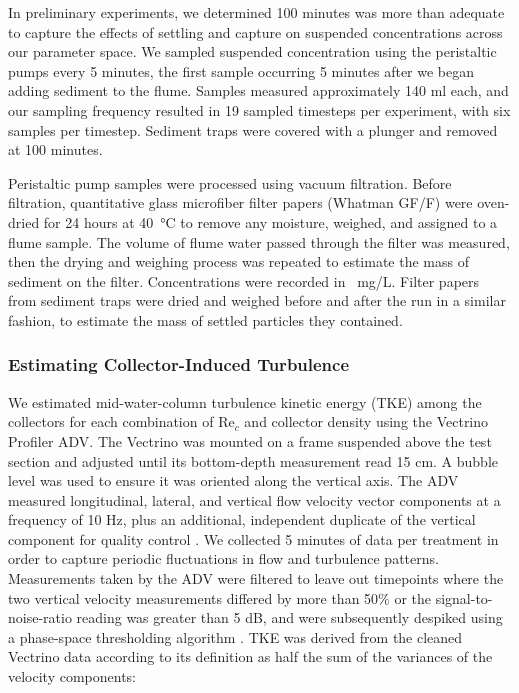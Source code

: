 \documentclass[geosciences,article,submit,moreauthors,pdftex]{Definitions/mdpi}
\newcommand\Rey{\mathrm{Re}}
\begin{document}
In preliminary experiments, we determined 100 minutes was more than adequate to capture the effects of settling and capture on suspended concentrations across our parameter space. We sampled suspended concentration using the peristaltic pumps every 5 minutes, the first sample occurring 5 minutes after we began adding sediment to the flume. Samples measured approximately 140 ml each, and our sampling frequency resulted in 19 sampled timesteps per experiment, with six samples per timestep. Sediment traps were covered with a plunger and removed at 100 minutes.

Peristaltic pump samples were processed using vacuum filtration. Before filtration, quantitative glass microfiber filter papers (Whatman GF/F) were oven-dried for 24 hours at \SI{40}{\celsius} to remove any moisture, weighed, and assigned to a flume sample. The volume of flume water passed through the filter was measured, then the drying and weighing process was repeated to estimate the mass of sediment on the filter. Concentrations were recorded in \SI{}{\milli\gram/\liter}. Filter papers from sediment traps were dried and weighed before and after the run in a similar fashion, to estimate the mass of settled particles they contained.

\subsubsection{Estimating Collector-Induced Turbulence}

We estimated mid-water-column turbulence kinetic energy (TKE) among the collectors for each combination of $\Rey_c$ and collector density using the Vectrino Profiler ADV. The Vectrino was mounted on a frame suspended above the test section and adjusted until its bottom-depth measurement read 15 cm. A bubble level was used to ensure it was oriented along the vertical axis. The ADV measured longitudinal, lateral, and vertical flow velocity vector components at a frequency of 10 Hz, plus an additional, independent duplicate of the vertical component for quality control \cite{nortek2018}. We collected 5 minutes of data per treatment in order to capture periodic fluctuations in flow and turbulence patterns. Measurements taken by the ADV were filtered to leave out timepoints where the two vertical velocity measurements differed by more than 50\% or the signal-to-noise-ratio reading was greater than 5 dB, and were subsequently despiked using a phase-space thresholding algorithm \cite{goring_nikora}. TKE was derived from the cleaned Vectrino data according to its definition as half the sum of the variances of the velocity components:
\end{document}
